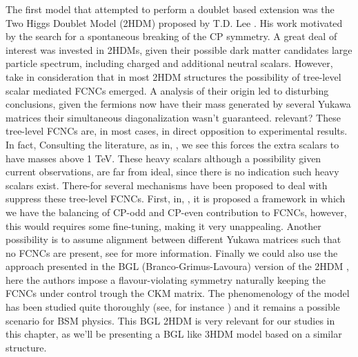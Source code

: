 The first model that attempted to perform a doublet based extension was the Two Higgs Doublet Model (2HDM) proposed by T.D. Lee \cite{Lee1973}.  
%
%
His work motivated by the search for a spontaneous breaking of the CP symmetry. 
%
A great deal of interest was invested in 2HDMs, given their possible dark matter candidates large particle spectrum, including charged and additional neutral scalars.
%
However, take in consideration that in most 2HDM structures the possibility of tree-level scalar mediated FCNCs emerged. 
% 
A analysis of their origin led to disturbing conclusions, given the fermions now have their mass generated by several Yukawa matrices their simultaneous diagonalization wasn't guaranteed. { \color{blue} relevant? } 
%
These tree-level FCNCs are, in most cases, in direct opposition to experimental results. 
%
In fact, Consulting the literature, as in, \cite{Branco:1999fs}, we see this forces the extra scalars to have masses above 1 TeV.
%
%
%
These heavy scalars although a possibility given current observations, are far from ideal, since there is no indication such heavy scalars exist. 
%
There-for several mechanisms have been proposed to deal with suppress these tree-level FCNCs. 
%
First, in, \cite{Ferreira_2011,Nebot_2015,ferreira2019strong}, it is proposed a framework in which we have the balancing of CP-odd and CP-even contribution to FCNCs, however, this would requires some fine-tuning, making it very unappealing. 
%
% 
Another possibility is to assume alignment between different Yukawa matrices such that no FCNCs are present, see \cite{Pich_2009,Jung_2010,Jung_2011} for more information. 
%
Finally we could also use the approach presented in the BGL (Branco-Grimus-Lavoura) version of the 2HDM \cite{Branco_1996,LAVOURA1994}, here the authors impose a flavour-violating symmetry naturally keeping the FCNCs under control trough the CKM matrix. 
%
The phenomenology of the model has been studied quite thoroughly (see, for instance \cite{Botella_2014,Botella_2016}) and it remains a possible scenario for BSM physics.
%
This BGL 2HDM is very relevant for our studies in this chapter, as we'll be presenting a BGL like 3HDM model based on a similar structure. 

